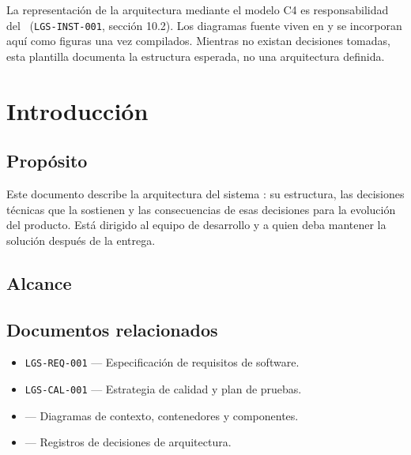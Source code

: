 \documentclass[11pt,a4paper]{article}
\begin{document}
\lgportada


\begin{porcompletar}
La representación de la arquitectura mediante el modelo C4 es responsabilidad del
\lgArquitectoRol\ (\texttt{LGS-INST-001}, sección 10.2). Los diagramas fuente
viven en  y se incorporan aquí como figuras una vez
compilados. Mientras no existan decisiones tomadas, esta plantilla documenta la
estructura esperada, no una arquitectura definida.
\end{porcompletar}

\tableofcontents
\clearpage

\section{Introducción}

\subsection{Propósito}

Este documento describe la arquitectura del sistema :
su estructura, las decisiones técnicas que la sostienen y las consecuencias de
esas decisiones para la evolución del producto. Está dirigido al equipo de
desarrollo y a quien deba mantener la solución después de la entrega.

\subsection{Alcance}

\begin{porcompletar}
\end{porcompletar}

\subsection{Documentos relacionados}

\begin{itemize}
  \item \texttt{LGS-REQ-001} — Especificación de requisitos de software.
  \item \texttt{LGS-CAL-001} — Estrategia de calidad y plan de pruebas.
  \item {} — Diagramas de contexto, contenedores y componentes.
  \item {} — Registros de decisiones de arquitectura.
\end{itemize}
\end{document}
